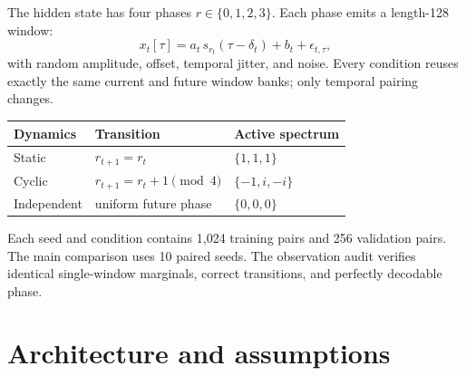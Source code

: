 \documentclass[11pt,a4paper]{article}
\begin{document}
The hidden state has four phases $r\in\{0,1,2,3\}$. Each phase emits a
length-128 window:
\[
x_t[\tau]=a_t\,s_{r_t}(\tau-\delta_t)+b_t+\epsilon_{t,\tau},
\]
with random amplitude, offset, temporal jitter, and noise. Every condition
reuses exactly the same current and future window banks; only temporal pairing
changes.

\begin{center}
\begin{tabularx}{\textwidth}{@{}lXl@{}}
\toprule
\textbf{Dynamics} & \textbf{Transition} & \textbf{Active spectrum}\\
\midrule
Static & $r_{t+1}=r_t$ & $\{1,1,1\}$\\
Cyclic & $r_{t+1}=r_t+1\pmod 4$ & $\{-1,i,-i\}$\\
Independent & uniform future phase & $\{0,0,0\}$\\
\bottomrule
\end{tabularx}
\end{center}

Each seed and condition contains 1,024 training pairs and 256 validation pairs.
The main comparison uses 10 paired seeds. The observation audit verifies
identical single-window marginals, correct transitions, and perfectly
decodable phase.

\section{Architecture and assumptions}
\end{document}
